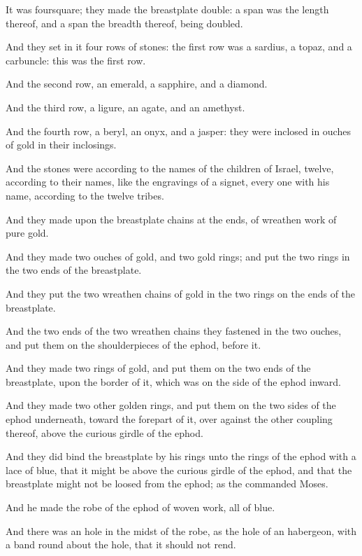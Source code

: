 \verse It was foursquare; they made the breastplate double: a span was the length thereof, and a span the breadth thereof, being doubled.

\verse And they set in it four rows of stones: the first row was a sardius, a topaz, and a carbuncle: this was the first row.

\verse And the second row, an emerald, a sapphire, and a diamond.

\verse And the third row, a ligure, an agate, and an amethyst.

\verse And the fourth row, a beryl, an onyx, and a jasper: they were inclosed in ouches of gold in their inclosings.

\verse And the stones were according to the names of the children of Israel, twelve, according to their names, like the engravings of a signet, every one with his name, according to the twelve tribes.

\verse And they made upon the breastplate chains at the ends, of wreathen work of pure gold.

\verse And they made two ouches of gold, and two gold rings; and put the two rings in the two ends of the breastplate.

\verse And they put the two wreathen chains of gold in the two rings on the ends of the breastplate.

\verse And the two ends of the two wreathen chains they fastened in the two ouches, and put them on the shoulderpieces of the ephod, before it.

\verse And they made two rings of gold, and put them on the two ends of the breastplate, upon the border of it, which was on the side of the ephod inward.

\verse And they made two other golden rings, and put them on the two sides of the ephod underneath, toward the forepart of it, over against the other coupling thereof, above the curious girdle of the ephod.

\verse And they did bind the breastplate by his rings unto the rings of the ephod with a lace of blue, that it might be above the curious girdle of the ephod, and that the breastplate might not be loosed from the ephod; as the \LORD commanded Moses.

\verse And he made the robe of the ephod of woven work, all of blue.

\verse And there was an hole in the midst of the robe, as the hole of an habergeon, with a band round about the hole, that it should not rend.


